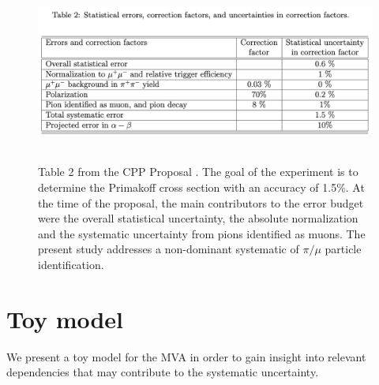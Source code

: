 \documentclass[12pt]{article}
\begin{document}
\begin{figure}[tbph]
\begin{center}
\includegraphics[height=6cm,clip=true]{Proposal_Table2}
\caption{Table 2 from the CPP Proposal \cite{CPPexp}. The goal of the experiment is to determine the Primakoff cross section with
an accuracy of 1.5\%. At the time of the proposal, the main contributors to the error budget were the overall statistical uncertainty, the absolute
normalization and the systematic uncertainty from pions identified as muons. The present study addresses a non-dominant systematic of 
$\pi/\mu$ particle identification.
\label{fig:Proposal_Table2}}
\end{center}
\end{figure} 

\section{Toy model}
We present a toy model for the MVA in order to gain insight into relevant dependencies that may contribute to the systematic uncertainty. 
\end{document}
